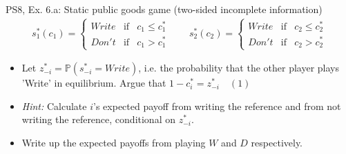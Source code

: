 \begin{frame}{PS8, Ex. 6.a: Static public goods game (two-sided incomplete information)}
    \begin{align*}
      s_1^*(c_1)=\left\{\begin{array}{rcl}
        Write & \text{if} & c_1\leq c_1^*\\
        Don't & \text{if} & c_1>c_1^*
        \end{array}\right.\quad\quad
      s_2^*(c_2)=\left\{\begin{array}{rcl}
        Write & \text{if} & c_2\leq c_2^*\\
        Don't & \text{if} & c_2>c_2^*
        \end{array}\right.
    \end{align*}
    \vspace{-12pt}
    \begin{itemize}
      \item[(a)] Let $z_{-i}^* = \mathbb{P}(s_{-i}^*=Write)$, i.e. the probability that the other player plays 'Write' in equilibrium. Argue that $1-c_i^*=z_{-i}^*\quad(1)$
      \item[] \textit{Hint:} Calculate $i$'s expected payoff from writing the reference and from not writing the reference, conditional on $z_{-i}^*$.
    \end{itemize}
    \vspace{-8pt}
    \begin{itemize}
      \item[Step 1:] Write up the expected payoffs from playing $W$ and $D$ respectively.
    \end{itemize}
\end{frame}

